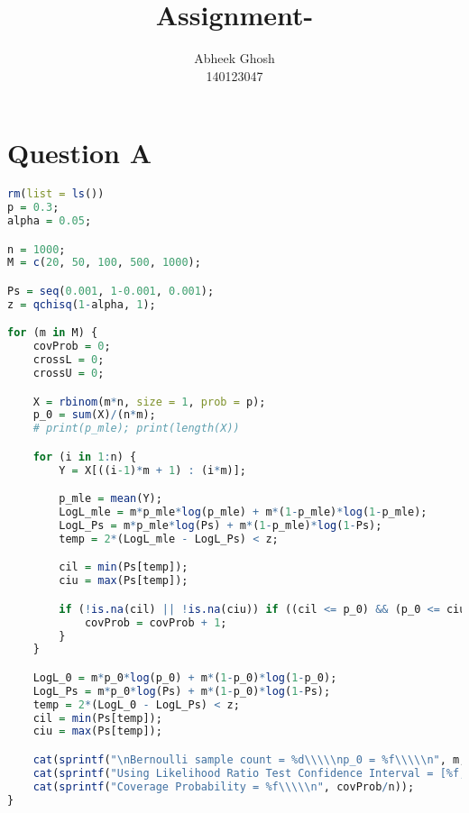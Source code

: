 \documentclass{article}
\begin{document}
	\title{\textbf{Assignment-}}
	\author{Abheek Ghosh \\ 
		140123047 }
	
	\maketitle
	

\section{Question A}


\begin{lstlisting}[language=R]
rm(list = ls())
p = 0.3;
alpha = 0.05;

n = 1000;
M = c(20, 50, 100, 500, 1000);

Ps = seq(0.001, 1-0.001, 0.001);
z = qchisq(1-alpha, 1);

for (m in M) {
	covProb = 0;
	crossL = 0;
	crossU = 0;

	X = rbinom(m*n, size = 1, prob = p);
	p_0 = sum(X)/(n*m);
	# print(p_mle); print(length(X))

	for (i in 1:n) {
		Y = X[((i-1)*m + 1) : (i*m)];

		p_mle = mean(Y);
		LogL_mle = m*p_mle*log(p_mle) + m*(1-p_mle)*log(1-p_mle);
		LogL_Ps = m*p_mle*log(Ps) + m*(1-p_mle)*log(1-Ps);
		temp = 2*(LogL_mle - LogL_Ps) < z;

		cil = min(Ps[temp]);
		ciu = max(Ps[temp]);

		if (!is.na(cil) || !is.na(ciu)) if ((cil <= p_0) && (p_0 <= ciu)) {
			covProb = covProb + 1;
		}
	}

	LogL_0 = m*p_0*log(p_0) + m*(1-p_0)*log(1-p_0);
	LogL_Ps = m*p_0*log(Ps) + m*(1-p_0)*log(1-Ps);
	temp = 2*(LogL_0 - LogL_Ps) < z;
	cil = min(Ps[temp]);
	ciu = max(Ps[temp]);

	cat(sprintf("\nBernoulli sample count = %d\\\\\np_0 = %f\\\\\n", m, p_0));
	cat(sprintf("Using Likelihood Ratio Test Confidence Interval = [%f, %f]\\\\\n", cil, ciu));
	cat(sprintf("Coverage Probability = %f\\\\\n", covProb/n));
}

\end{lstlisting}
\end{document}
